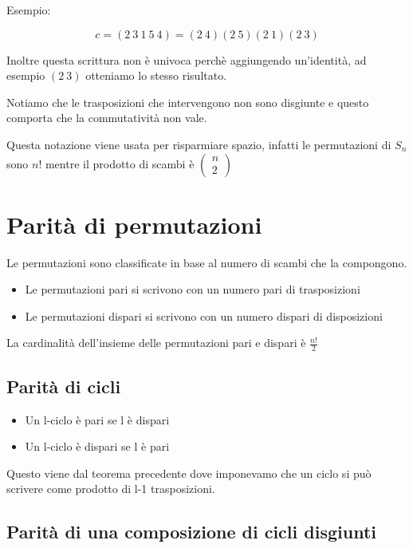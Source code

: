 \documentclass[a4paper, 10pt]{article}
\begin{document}
Esempio:

$$c=\left(2\ 3\ 1\ 5\ 4\right)=\left(2\ 4\right)\left(2\ 5\right)\left(2\ 1\right)\left(2\ 3\right)$$

Inoltre questa scrittura non è univoca perchè aggiungendo un'identità, ad esempio $(2\ 3)$ otteniamo lo stesso risultato.

Notiamo che le trasposizioni che intervengono non sono disgiunte e questo comporta che la commutatività non vale.

Questa notazione viene usata per risparmiare spazio, infatti le permutazioni di $S_n$ sono $n!$ mentre il prodotto di scambi è $ \begin{pmatrix}
	n \\
	2 
\end{pmatrix}  $

\section{Parità di permutazioni}

Le permutazioni sono classificate in base al numero di scambi che la compongono.

\begin{itemize}
	\item Le permutazioni pari si scrivono con un numero pari di trasposizioni
	\item Le permutazioni dispari si scrivono con un numero dispari di disposizioni
\end{itemize}

La cardinalità dell'insieme delle permutazioni pari e dispari è $\frac{n!}{2}$

\subsection{Parità di cicli}

\begin{itemize}
	\item Un l-ciclo è pari se l è dispari
	\item Un l-ciclo è dispari se l è pari
\end{itemize}

Questo viene dal teorema precedente dove imponevamo che un ciclo si può scrivere come prodotto di l-1 trasposizioni.

\subsection{Parità di una composizione di cicli disgiunti}
\end{document}

